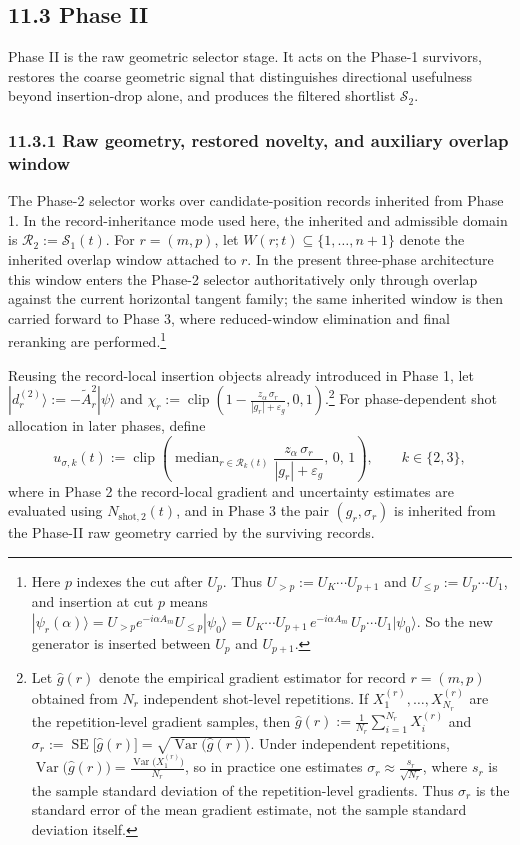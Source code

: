 \documentclass[11pt]{article}
\begin{document}
\subsection*{11.3 Phase II}
Phase II is the raw geometric selector stage. It acts on the Phase-1 survivors, restores the coarse geometric signal that distinguishes directional usefulness beyond insertion-drop alone, and produces the filtered shortlist \(\mathcal S_2\).

\subsubsection*{11.3.1 Raw geometry, restored novelty, and auxiliary overlap window}

The Phase-2 selector works over candidate-position records inherited from Phase 1. In the record-inheritance mode used here, the inherited and admissible domain is \(\mathcal R_2:=\mathcal S_1(t)\). For \(r=(m,p)\), let \(W(r;t)\subseteq\{1,\dots,n+1\}\) denote the inherited overlap window attached to \(r\). In the present three-phase architecture this window enters the Phase-2 selector authoritatively only through overlap against the current horizontal tangent family; the same inherited window is then carried forward to Phase 3, where reduced-window elimination and final reranking are performed.\footnote{Here \(p\) indexes the cut after \(U_p\). Thus \(U_{>p}:=U_K\cdots U_{p+1}\) and \(U_{\le p}:=U_p\cdots U_1\), and insertion at cut \(p\) means \( |\psi_r(\alpha)\rangle = U_{>p}e^{-i\alpha A_m}U_{\le p}|\psi_0\rangle = U_K\cdots U_{p+1}\,e^{-i\alpha A_m}\,U_p\cdots U_1|\psi_0\rangle \). So the new generator is inserted between \(U_p\) and \(U_{p+1}\).}

Reusing the record-local insertion objects already introduced in Phase 1, let \(|d_r^{(2)}\rangle:=-\widetilde A_r^2|\psi\rangle\) and \(\chi_r:=\operatorname{clip}\!\left(1-\frac{z_\alpha\,\sigma_r}{|g_r|+\varepsilon_g},0,1\right)\).\footnote{Let \(\widehat g(r)\) denote the empirical gradient estimator for record \(r=(m,p)\) obtained from \(N_r\) independent shot-level repetitions. If \(X^{(r)}_1,\dots,X^{(r)}_{N_r}\) are the repetition-level gradient samples, then \(\widehat g(r):=\frac{1}{N_r}\sum_{i=1}^{N_r} X^{(r)}_i\) and \(\sigma_r:=\operatorname{SE}\!\big[\widehat g(r)\big]=\sqrt{\operatorname{Var}\!\big(\widehat g(r)\big)}\). Under independent repetitions, \(\operatorname{Var}\!\big(\widehat g(r)\big)=\frac{\operatorname{Var}\!\big(X^{(r)}_1\big)}{N_r}\), so in practice one estimates \(\sigma_r\approx \frac{s_r}{\sqrt{N_r}}\), where \(s_r\) is the sample standard deviation of the repetition-level gradients. Thus \(\sigma_r\) is the standard error of the mean gradient estimate, not the sample standard deviation itself.}
For phase-dependent shot allocation in later phases, define
\[
u_{\sigma,k}(t):=
\operatorname{clip}\!\left(
\operatorname{median}_{r\in\mathcal R_k(t)}
\frac{z_\alpha\,\sigma_r}{|g_r|+\varepsilon_g},
\,0,\,1
\right),
\qquad
k\in\{2,3\},
\]
where in Phase 2 the record-local gradient and uncertainty estimates are evaluated using \(N_{\mathrm{shot},2}(t)\), and in Phase 3 the pair \((g_r,\sigma_r)\) is inherited from the Phase-II raw geometry carried by the surviving records.
\end{document}
